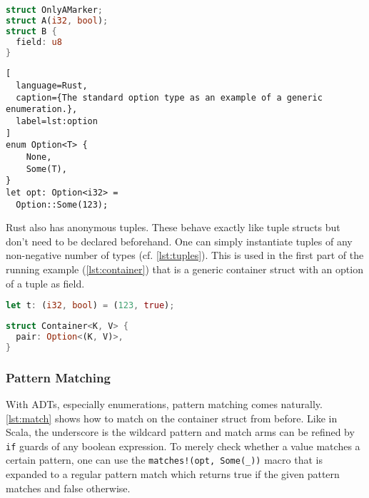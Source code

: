 \noindent\begin{minipage}[t]{.48\textwidth}
\begin{lstlisting}[language=Rust, caption={All three forms of structs.}, label=lst:struct-ex]
struct OnlyAMarker;
struct A(i32, bool);
struct B {
  field: u8
}
\end{lstlisting}
\end{minipage}\hfill
\begin{minipage}[t]{.48\textwidth}
\begin{lstlisting}[
  language=Rust,
  caption={The standard option type as an example of a generic enumeration.},
  label=lst:option
]
enum Option<T> {
    None,
    Some(T),
}
let opt: Option<i32> =
  Option::Some(123);
\end{lstlisting}
\end{minipage}

Rust also has anonymous tuples. These behave exactly like tuple structs but
don't need to be declared beforehand. One can simply instantiate tuples of any
non-negative number of types (cf. \autoref{lst:tuples}). This is used in the
first part of the running example (\autoref{lst:container}) that is a generic
container struct with an option of a tuple as field.

\noindent\begin{minipage}[t]{.48\textwidth}
\begin{lstlisting}[language=Rust, style=short, caption={A 2-tuple in Rust.}, label=lst:tuples]
let t: (i32, bool) = (123, true);
\end{lstlisting}
\end{minipage}\hfill
\begin{minipage}[t]{.48\textwidth}
\begin{lstlisting}[language=Rust, style=short, label={lst:container}, caption={The struct for the running example.}]
struct Container<K, V> {
  pair: Option<(K, V)>,
}
\end{lstlisting}
\end{minipage}

\subsubsection{Pattern Matching}

With ADTs, especially enumerations, pattern matching comes naturally.
\autoref{lst:match} shows how to match on the container struct from before. Like
in Scala, the underscore is the wildcard pattern and match arms can be  refined
by \lstinline!if! guards of any boolean expression. To merely check whether a
value matches a certain pattern, one can use the
\passthrough{\lstinline"matches!(opt, Some(_))"} macro that is expanded to a
regular pattern match which returns true if the given pattern matches and false
otherwise.

